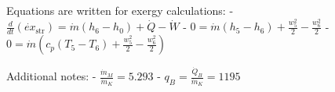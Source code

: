 Equations are written for exergy calculations:  
- \( \frac{d}{dt} \left( \dot{ex}_{\text{str}} \right) = \dot{m} \left( h_6 - h_0 \right) + \dot{Q} - \dot{W} \)  
- \( 0 = \dot{m} \left( h_5 - h_6 \right) + \frac{w_5^2}{2} - \frac{w_6^2}{2} \)  
- \( 0 = \dot{m} \left( c_p \left( T_5 - T_6 \right) + \frac{w_5^2}{2} - \frac{w_6^2}{2} \right) \)  

Additional notes:  
- \( \frac{\dot{m}_M}{\dot{m}_K} = 5.293 \)  
- \( q_B = \frac{\dot{Q}_B}{\dot{m}_K} = 1195 \)